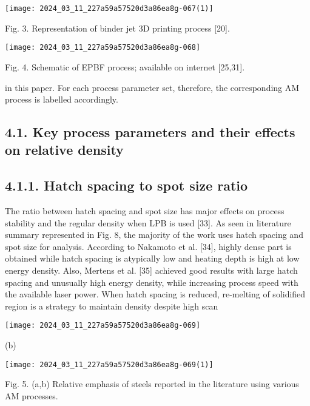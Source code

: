 \documentclass[10pt]{article}
\begin{document}
\begin{center}
\texttt{[image: 2024\_03\_11\_227a59a57520d3a86ea8g-067(1)]}
\end{center}

Fig. 3. Representation of binder jet 3D printing process [20].

\begin{center}
\texttt{[image: 2024\_03\_11\_227a59a57520d3a86ea8g-068]}
\end{center}

Fig. 4. Schematic of EPBF process; available on internet [25,31].

in this paper. For each process parameter set, therefore, the corresponding AM process is labelled accordingly.

\subsection*{4.1. Key process parameters and their effects on relative density}
\subsection*{4.1.1. Hatch spacing to spot size ratio}
The ratio between hatch spacing and spot size has major effects on process stability and the regular density when LPB is used [33]. As seen in literature summary represented in Fig. 8, the majority of the work uses hatch spacing and spot size for analysis. According to Nakamoto et al. [34], highly dense part is obtained while hatch spacing is atypically low and heating depth is high at low energy density. Also, Mertens et al. [35] achieved good results with large hatch spacing and unusually high energy density, while increasing process speed with the available laser power. When hatch spacing is reduced, re-melting of solidified region is a strategy to maintain density despite high scan

\begin{center}
\texttt{[image: 2024\_03\_11\_227a59a57520d3a86ea8g-069]}
\end{center}

(b)

\begin{center}
\texttt{[image: 2024\_03\_11\_227a59a57520d3a86ea8g-069(1)]}
\end{center}

Fig. 5. (a,b) Relative emphasis of steels reported in the literature using various AM processes.
\end{document}
